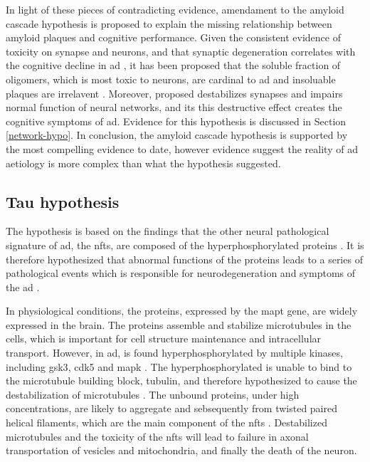 In light of these pieces of contradicting evidence, amendament to the amyloid cascade hypothesis is proposed to explain the missing relationship between amyloid plaques and cognitive performance. Given the consistent evidence of \abeta{} toxicity on synapse and neurons\citep{ferreira15}, and that synaptic degeneration correlates with the cognitive decline in \gls{ad} \citep{selkoe02, coleman04}, it has been proposed that the soluble fraction of \abeta{} oligomers, which is most toxic to neurons, are cardinal to \gls{ad} and insoluable plaques are irrelavent \citep{ferreira15}. Moreover, \citet{canter16} proposed \abeta{} destabilizes synapses and impairs normal function of neural networks, and its this destructive effect creates the cognitive symptoms of \gls{ad}. Evidence for this hypothesis is discussed in Section \ref{network-hypo}. In conclusion, the amyloid cascade hypothesis is supported by the most compelling evidence to date, however evidence suggest the reality of \gls{ad} aetiology is more complex than what the hypothesis suggested.

\subsection{Tau hypothesis}

The \atau{} hypothesis is based on the findings that the other neural pathological signature of \gls{ad}, the \glspl{nft}, are composed of the hyperphosphorylated \atau{} proteins \citep{grundke-iqbal86}. It is therefore hypothesized that abnormal functions of the \atau{} proteins leads to a series of pathological events which is responsible for neurodegeneration and symptoms of the \gls{ad} \citep{goedert11}.

In physiological conditions, the \atau{} proteins, expressed by the \gls{mapt} gene, are widely expressed in the brain. The \atau{} proteins assemble and stabilize microtubules in the cells, which is important for cell structure maintenance and intracellular transport. However, in \gls{ad}, \atau{} is found hyperphosphorylated by multiple kinases, including \gls{gsk3}, \gls{cdk5} and \gls{mapk} \citep{singh94}. The hyperphosphorylated \atau{} is unable to bind to the microtubule building block, tubulin, and therefore hypothesized to cause the destabilization of microtubules \citep{bramblett93, yoshida93, alonso94}. The unbound \atau{} proteins, under high concentrations, are likely to aggregate and sebsequently from twisted paired helical filaments, which are the main component of the \glspl{nft} \citep{kidd63, kuret05}. Destabilized microtubules and the toxicity of the \glspl{nft} will lead to failure in axonal transportation of vesicles and mitochondria, and finally the death of the neuron.

